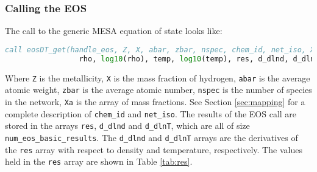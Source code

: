 \subsubsection{Calling the EOS}

The call to the generic {\sf MESA} equation of state looks like:
\begin{lstlisting}[language=fortran,mathescape=false]
  call eosDT_get(handle_eos, Z, X, abar, zbar, nspec, chem_id, net_iso, Xa, &
                 rho, log10(rho), temp, log10(temp), res, d_dlnd, d_dlnT, ierr)
\end{lstlisting}
Where {\tt Z} is the metallicity, {\tt X} is the mass fraction of hydrogen, 
{\tt abar} is the average atomic weight, {\tt zbar} is the average atomic 
number, {\tt nspec} is the number of species in the network, {\tt Xa} is 
the array of mass fractions. See Section \ref{sec:mapping} for a complete 
description of {\tt chem\_id} and {\tt net\_iso}. The results of the EOS call 
are stored in the arrays {\tt res}, {\tt d\_dlnd} and {\tt d\_dlnT}, which 
are all of size {\tt num\_eos\_basic\_results}. The {\tt d\_dlnd} and 
{\tt d\_dlnT} arrays are the derivatives of the {\tt res} array with respect 
to density and temperature, respectively. The values held in the {\tt res} 
array are shown in Table \ref{tab:res}.


